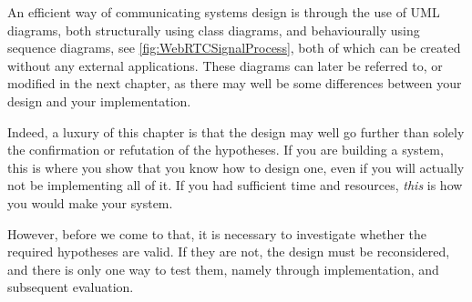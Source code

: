 An efficient way of communicating systems design is through the use of
\ac{UML} diagrams, both structurally using class diagrams, and behaviourally
using sequence diagrams, see \autoref{fig:WebRTCSignalProcess}, both of
which can be created without any external applications.  These diagrams can
later be referred to, or modified in the next chapter, as there may well be
some differences between your design and your implementation.

Indeed, a luxury of this chapter is that the design may well go further than
solely the confirmation or refutation of the hypotheses.  If you are
building a system, this is where you show that you know how to design one,
even if you will actually not be implementing all of it.  If you had
sufficient time and resources, \emph{this} is how you would make your
system.

However, before we come to that, it is necessary to investigate whether the
required hypotheses are valid. If they are not, the design must be
reconsidered, and there is only one way to test them, namely through
implementation, and subsequent evaluation.


